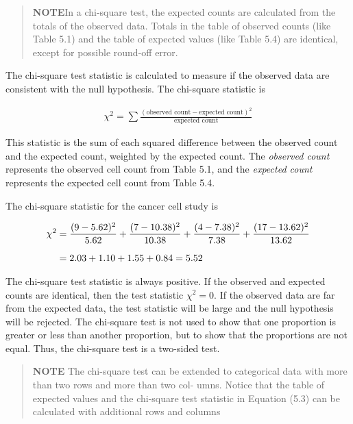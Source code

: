 \documentclass[
]{book}
\begin{document}
\begin{quote}
\textbf{NOTE}In a chi-square test, the expected counts are calculated from the totals of the observed data. Totals in the table of observed counts (like Table 5.1) and the table of expected values (like Table 5.4) are identical, except for possible round-off error.\\
\normalsize
\end{quote}

The chi-square test statistic is calculated to measure if the observed data are consistent with the null
hypothesis. The chi-square statistic is

\begin{align} \label{5.3}
\chi^2 = \sum \frac{(\text{observed count} - \text{expected count})^2}{\text{expected count}} 
\tag{5.3}
\end{align}

This statistic is the sum of each squared difference between the observed count and the expected count,
weighted by the expected count. The \emph{observed count} represents the observed cell count from Table 5.1, and the \emph{expected count} represents the expected cell count from Table 5.4.

The chi-square statistic for the cancer cell study is

\begin{align}
\chi^2
&= \frac{(9 - 5.62)^2}{5.62} + \frac{(7 - 10.38)^2}{10.38} + \frac{(4 - 7.38)^2}{7.38} + \frac{(17 - 13.62)^2}{13.62} \\[6pt] \notag
&= 2.03 + 1.10 + 1.55 + 0.84 = 5.52 \notag
\end{align}

The chi-square test statistic is always positive. If the observed and expected counts are identical, then the test statistic \(\chi^2 = 0\). If the observed data are far from the expected data, the test statistic will be large and the null hypothesis will be rejected. The chi-square test is not used to show that one proportion is greater or less than another proportion, but to show that the proportions are not equal. Thus, the chi-square test is a two-sided test.

\begin{quote}
\textbf{NOTE} The chi-square test can be extended to categorical data with more than two rows and more than two col-
umns. Notice that the table of expected values and the chi-square test statistic in Equation (5.3) can be calculated with additional rows and columns
\end{quote}
\end{document}
